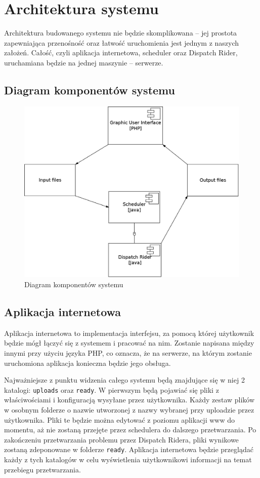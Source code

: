 \chapter{Architektura systemu}
Architektura budowanego systemu nie będzie skomplikowana -- jej prostota zapewniająca przenośność oraz łatwość uruchomienia jest jednym z naszych założeń. Całość, czyli aplikacja internetowa, scheduler oraz Dispatch Rider, uruchamiana
będzie na jednej maszynie -- serwerze.


\section{Diagram komponentów systemu}
\begin{center}
\begin{figure}[H]
\centering
\includegraphics[scale=0.35]{imgs/IO.jpeg}
\caption{Diagram komponentów systemu}
\label{fig:diagram_komponentow}
\end{figure}
\end{center}

\section{Aplikacja internetowa}
Aplikacja internetowa to implementacja interfejsu, za pomocą której użytkownik będzie mógł łączyć się z systemem i pracować na nim.
Zostanie napisana między innymi przy użyciu języka PHP, co oznacza, że na serwerze,
na którym zostanie uruchomiona aplikacja konieczna będzie jego obsługa.

Najważniejsze z punktu widzenia całego systemu będą znajdujące się w niej 2 katalogi: \texttt{uploads}
oraz \texttt{ready}. W pierwszym będą pojawiać się pliki z właściwościami i konfiguracją wysyłane przez 
użytkownika. Każdy zestaw plików w osobnym folderze o nazwie utworzonej z nazwy wybranej przy uploadzie
przez użytkownika. Pliki te będzie można edytować z poziomu aplikacji www do momentu, aż nie zostaną
przejęte przez schedulera do dalszego przetwarzania. Po zakończeniu przetwarzania problemu przez Dispatch
Ridera, pliki wynikowe zostaną zdeponowane w folderze \texttt{ready}. Aplikacja internetowa będzie przeglądać
każdy z tych katalogów w celu wyświetlenia użytkownikowi informacji na temat przebiegu przetwarzania.

